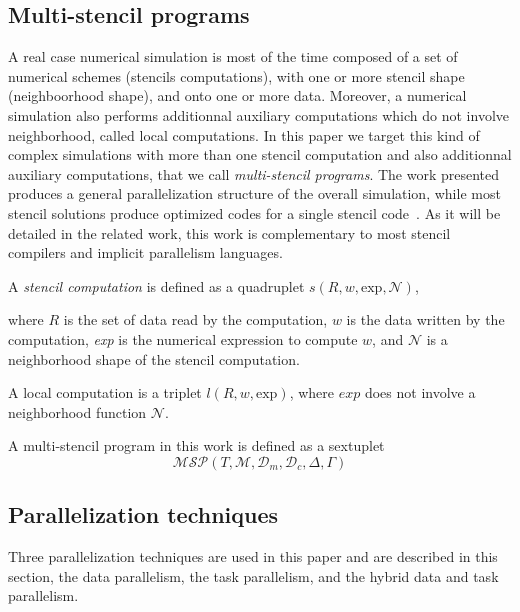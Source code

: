 \subsection{Multi-stencil programs}
\label{sect:multistencil}
A real case numerical simulation is most of the time composed of a set of numerical schemes (stencils computations), with one or more stencil shape (neighboorhood shape), and onto one or more data. Moreover, a numerical simulation also performs additionnal auxiliary computations which do not involve neighborhood, called local computations. In this paper we target this kind of complex simulations with more than one stencil computation and also additionnal auxiliary computations, that we call \emph{multi-stencil programs}. The work presented produces a general parallelization structure of the overall simulation, while most stencil solutions produce optimized codes for a single stencil code~\cite{citeulike12258902, spaaTangCKLL11, Giles2011}. As it will be detailed in the related work, this work is complementary to most stencil compilers and implicit parallelism languages.

\begin{mydef}
A \textit{stencil computation} is defined as a quadruplet $s(R,w,\text{exp},\mathcal{N})$,
\end{mydef}
where $R$ is the set of data read by the computation, $w$ is the data written by the computation, \textit{exp} is the numerical expression to compute $w$, and $\mathcal{N}$ is a neighborhood shape of the stencil computation.

\begin{mydef}
A local computation is a triplet $l(R,w,\text{exp})$, where $exp$ does not involve a neighborhood function $\mathcal{N}$.
\end{mydef}

A multi-stencil program in this work is defined as a sextuplet
\begin{equation*} 
\mathcal{MSP}(T,\mathcal{M},\mathcal{D}_m,\mathcal{D}_c,\Delta,\Gamma)
\end{equation*}

\subsection{Parallelization techniques}
\label{sect:parallel}
Three parallelization techniques are used in this paper and are described in this section, the data parallelism, the task parallelism, and the hybrid data and task parallelism.

